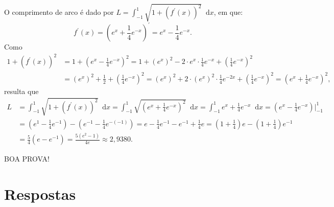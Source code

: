 \documentclass[12pt,a4paper]{article}
\newcommand*\diff{\mathop{}\!\mathrm{d}}
\begin{document}
\begin{ExerciseList}
O comprimento de arco é dado por $L = \int_{-1}^1 \sqrt{1 + \left(f^\prime(x)\right)^2} \diff{x}$, em que:
\[
  f^\prime(x)
  = \left(e^x + \frac{1}{4} e^{-x}\right)^\prime
  = e^x - \frac{1}{4} e^{-x}.
\]
Como
\begin{align*}
  1 + \left(f^\prime(x)\right)^2
  & = 1 + \left(e^x - \frac{1}{4} e^{-x}\right)^2
    = 1 + (e^{x})^2 - 2 \cdot e^x \cdot \frac{1}{4} e^{-x} + \left(\frac{1}{4}e^{-x}\right)^2 \\
  & = (e^{x})^2 + \frac{1}{2} + \left(\frac{1}{4}e^{-x}\right)^2
    = (e^{x})^2 + 2 \cdot (e^{x})^2\cdot \frac{1}{4} e^{-2x} + \left(\frac{1}{4}e^{-x}\right)^2
    = \left(e^{x} + \frac{1}{4}e^{-x} \right)^2,
\end{align*}
resulta que
\begin{align*}
  L
  & = \int_{-1}^1 \sqrt{1 + \left(f^\prime(x)\right)^2} \diff{x}
    = \int_{-1}^1 \sqrt{\left(e^{x} + \frac{1}{4}e^{-x} \right)^2} \diff{x}
    = \int_{-1}^1 e^{x} + \frac{1}{4}e^{-x} \diff{x}
    = \left(e^{x} - \frac{1}{4}e^{-x}\right)\bigg\rvert_{-1}^1 \\
  & = \left(e^{1} - \frac{1}{4}e^{-1}\right) - \left(e^{-1} - \frac{1}{4}e^{-(-1)}\right)
    = e - \frac{1}{4}e^{-1} - e^{-1} + \frac{1}{4}e
    = \left(1+\frac{1}{4}\right)e - \left(1+\frac{1}{4}\right)e^{-1}\\
  & = \frac{5}{4}(e - e^{-1})
    = \frac{5 (e^2 - 1)}{4 e}
    \approx 2,9380.
\end{align*}
\end{ExerciseList}

\vfill
\begin{center}
BOA PROVA!
\end{center}

\newpage
\restoregeometry
\section*{Respostas}
\shipoutAnswer
\end{document}
